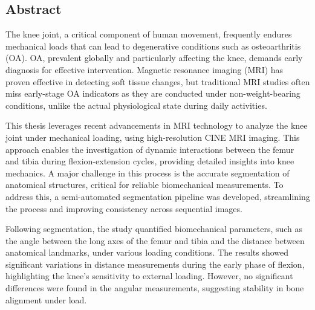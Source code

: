\documentclass{micro-econ-thesis}
\begin{document}
\thesisDate{\today}
\thesisCompany{}

\thesisMakeTitle

\cleardoublepage
{}
\pagestyle{plain}
\subsection*{Abstract}

The knee joint, a critical component of human movement, frequently endures mechanical loads that can lead to degenerative conditions such as osteoarthritis (OA). OA, prevalent globally and particularly affecting the knee, demands early diagnosis for effective intervention. Magnetic resonance imaging (MRI) has proven effective in detecting soft tissue changes, but traditional MRI studies often miss early-stage OA indicators as they are conducted under non-weight-bearing conditions, unlike the actual physiological state during daily activities.

This thesis leverages recent advancements in MRI technology to analyze the knee joint under mechanical loading, using high-resolution CINE MRI imaging. This approach enables the investigation of dynamic interactions between the femur and tibia during flexion-extension cycles, providing detailed insights into knee mechanics. A major challenge in this process is the accurate segmentation of anatomical structures, critical for reliable biomechanical measurements. To address this, a semi-automated segmentation pipeline was developed, streamlining the process and improving consistency across sequential images.

Following segmentation, the study quantified biomechanical parameters, such as the angle between the long axes of the femur and tibia and the distance between anatomical landmarks, under various loading conditions. The results showed significant variations in distance measurements during the early phase of flexion, highlighting the knee's sensitivity to external loading. However, no significant differences were found in the angular measurements, suggesting stability in bone alignment under load.
\end{document}
